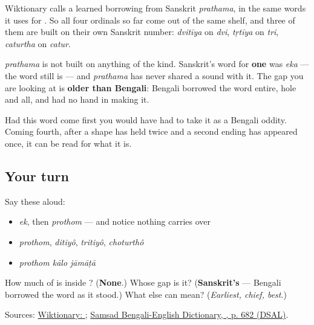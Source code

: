\begin{cousinweb}
Wiktionary calls \textbf{} a learned borrowing from Sanskrit \emph{prathama}, in the same words it uses for \textbf{}. So all four ordinals so far come out of the same shelf, and three of them are built on their own Sanskrit number: \emph{dvitīya} on \emph{dvi}, \emph{tṛtīya} on \emph{tri}, \emph{caturtha} on \emph{catur}.

\emph{prathama} is not built on anything of the kind. Sanskrit's word for \textbf{one} was \emph{eka} — the word \textbf{} still is — and \emph{prathama} has never shared a sound with it. The gap you are looking at is \textbf{older than Bengali}: Bengali borrowed the word entire, hole and all, and had no hand in making it.

Had this word come first you would have had to take it as a Bengali oddity. Coming fourth, after a shape has held twice and a second ending has appeared once, it can be read for what it is.
\end{cousinweb}

\subsection*{Your turn}
Say these aloud:

\begin{itemize}
\raggedright
  \item \emph{ek}, then \emph{prothom} — and notice nothing carries over
  \item \emph{prothom}, \emph{ditiyô}, \emph{tritiyô}, \emph{choturthô}
  \item \emph{prothom kālo jāmāṭā}
\end{itemize}

\begin{tcolorbox}[breakable,colback=teal!4,colframe=teal!35!black,title={Before you move on}]
How much of \textbf{} is inside \textbf{}? (\textbf{None}.) Whose gap is it? (\textbf{Sanskrit's} — Bengali borrowed the word as it stood.) What else can \textbf{} mean? (\emph{Earliest, chief, best}.)

Sources: \href{https://en.wiktionary.org/wiki/\%E0\%A6\%AA\%E0\%A7\%8D\%E0\%A6\%B0\%E0\%A6\%A5\%E0\%A6\%AE}{Wiktionary: }; \href{https://dsal.uchicago.edu/cgi-bin/app/biswas-bengali\_query.py?qs=\%E0\%A6\%AA\%E0\%A7\%8D\%E0\%A6\%B0\%E0\%A6\%A5\%E0\%A6\%AE\&searchhws=yes}{Samsad Bengali-English Dictionary, , p. 682 (DSAL)}.
\end{tcolorbox}
